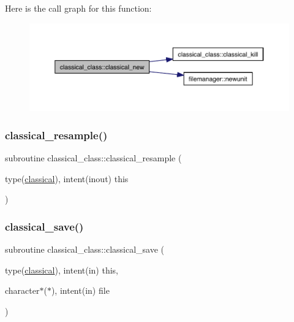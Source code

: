 Here is the call graph for this function\+:\nopagebreak
\begin{figure}[H]
\begin{center}
\leavevmode
\includegraphics[width=350pt]{namespaceclassical__class_a6e5dda0e17a3e5cb552a289231d488fd_cgraph}
\end{center}
\end{figure}
\mbox{\label{namespaceclassical__class_a9b5ff74fe77b1370f4ca34d3bb3783c9}} 
\subsubsection{\texorpdfstring{classical\+\_\+resample()}{classical\_resample()}}
{\footnotesize\ttfamily subroutine classical\+\_\+class\+::classical\+\_\+resample (\begin{DoxyParamCaption}\item[{type(\hyperlink{structclassical__class_1_1classical}{classical}), intent(inout)}]{this }\end{DoxyParamCaption})\hspace{0.3cm}{\ttfamily [private]}}

\mbox{\label{namespaceclassical__class_a961b68acb4e6f345ae596a8424866657}} 
\subsubsection{\texorpdfstring{classical\+\_\+save()}{classical\_save()}}
{\footnotesize\ttfamily subroutine classical\+\_\+class\+::classical\+\_\+save (\begin{DoxyParamCaption}\item[{type(\hyperlink{structclassical__class_1_1classical}{classical}), intent(in)}]{this,  }\item[{character$\ast$($\ast$), intent(in)}]{file }\end{DoxyParamCaption})\hspace{0.3cm}{\ttfamily [private]}}

